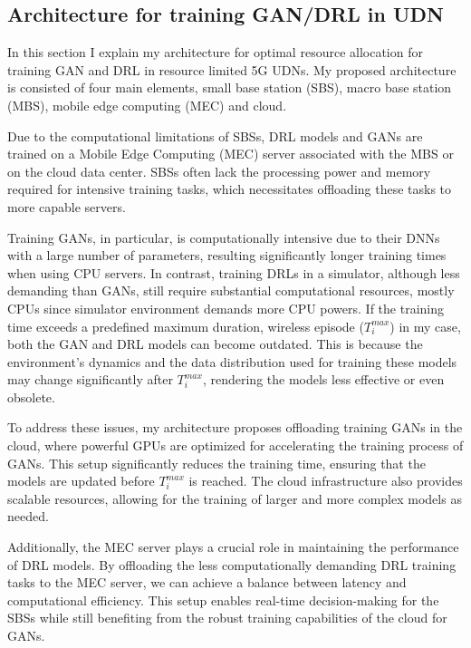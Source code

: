 \documentclass[letterpaper%
, twoside%
, 12pt%
,memoire%
, english%
,creativecommons,hyperref, withAlgo2e %
]{thETS}
\numberwithin{algorithm}{chapter}
\begin{document}


\subsection{Architecture for training GAN/DRL in UDN}

In this section I explain my  architecture for optimal resource allocation for training GAN and DRL in resource limited 5G UDNs. My proposed architecture is consisted of four main elements, small base station (SBS), macro base station (MBS), mobile edge computing (MEC) and cloud. 




Due to the computational limitations of SBSs, DRL models and GANs are trained on a Mobile Edge Computing (MEC) server associated with the MBS or on the cloud data center. SBSs often lack the processing power and memory required for intensive training tasks, which necessitates offloading these tasks to more capable servers.

Training GANs, in particular, is computationally intensive due to their DNNs with a large number of parameters, resulting significantly longer training times when using CPU servers. In contrast, training DRLs in a simulator, although less demanding than GANs, still require substantial computational resources, mostly CPUs since simulator environment demands more CPU powers. If the training time exceeds a predefined maximum duration, wireless episode (\(T_i^{max}\)) in my  case, both the GAN and DRL models can become outdated. This is because the environment's dynamics and the data distribution used for training these models may change significantly after \(T_i^{max}\), rendering the models less effective or even obsolete.

To address these issues, my  architecture proposes offloading training GANs in the cloud, where powerful GPUs are optimized for accelerating the training process of GANs. This setup significantly reduces the training time, ensuring that the models are updated before \(T_i^{max}\) is reached. The cloud infrastructure also provides scalable resources, allowing for the training of larger and more complex models as needed.

Additionally, the MEC server plays a crucial role in maintaining the performance of DRL models. By offloading the less computationally demanding DRL training tasks to the MEC server, we can achieve a balance between latency and computational efficiency. This setup enables real-time decision-making for the SBSs while still benefiting from the robust training capabilities of the cloud for GANs.
\end{document}
